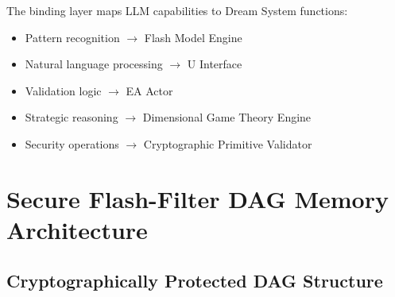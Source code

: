 \documentclass[12pt,a4paper]{article}
\begin{document}
The binding layer maps LLM capabilities to Dream System functions:
\begin{itemize}
    \item Pattern recognition $\rightarrow$ Flash Model Engine
    \item Natural language processing $\rightarrow$ U Interface
    \item Validation logic $\rightarrow$ EA Actor
    \item Strategic reasoning $\rightarrow$ Dimensional Game Theory Engine
    \item Security operations $\rightarrow$ Cryptographic Primitive Validator
\end{itemize}

\section{Secure Flash-Filter DAG Memory Architecture}

\subsection{Cryptographically Protected DAG Structure}
\end{document}
